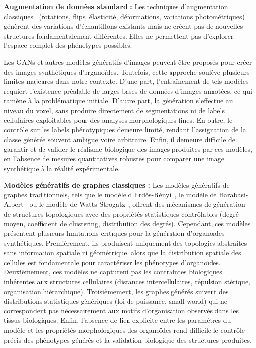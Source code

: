 \textbf{Augmentation de données standard :}
Les techniques d'augmentation classiques~\cite{Shorten2019} (rotations, flips, élasticité, déformations, variations photométriques) génèrent des variations d'échantillons existants mais ne créent pas de nouvelles structures fondamentalement différentes. Elles ne permettent pas d'explorer l'espace complet des phénotypes possibles.

Les GANs et autres modèles génératifs d'images peuvent être proposés pour créer des images synthétiques d'organoïdes. Toutefois, cette approche soulève plusieurs limites majeures dans notre contexte. D'une part, l'entraînement de tels modèles requiert l'existence préalable de larges bases de données d'images annotées, ce qui ramène à la problématique initiale. D'autre part, la génération s'effectue au niveau du voxel, sans produire directement de segmentations ni de labels cellulaires exploitables pour des analyses morphologiques fines. En outre, le contrôle sur les labels phénotypiques demeure limité, rendant l'assignation de la classe générée souvent ambiguë voire arbitraire. Enfin, il demeure difficile de garantir et de valider le réalisme biologique des images produites par ces modèles, en l'absence de mesures quantitatives robustes pour comparer une image synthétique à la réalité expérimentale.

\textbf{Modèles génératifs de graphes classiques :}
Les modèles génératifs de graphes traditionnels, tels que le modèle d'Erdős-Rényi~\cite{Erdos1959}, le modèle de Barabási-Albert~\cite{Barabasi1999} ou le modèle de Watts-Strogatz~\cite{Watts1998}, offrent des mécanismes de génération de structures topologiques avec des propriétés statistiques contrôlables (degré moyen, coefficient de clustering, distribution des degrés). Cependant, ces modèles présentent plusieurs limitations critiques pour la génération d'organoïdes synthétiques. Premièrement, ils produisent uniquement des topologies abstraites sans information spatiale ni géométrique, alors que la distribution spatiale des cellules est fondamentale pour caractériser les phénotypes d'organoïdes. Deuxièmement, ces modèles ne capturent pas les contraintes biologiques inhérentes aux structures cellulaires (distances intercellulaires, répulsion stérique, organisation hiérarchique). Troisièmement, les graphes générés suivent des distributions statistiques génériques (loi de puissance, small-world) qui ne correspondent pas nécessairement aux motifs d'organisation observés dans les tissus biologiques. Enfin, l'absence de lien explicite entre les paramètres du modèle et les propriétés morphologiques des organoïdes rend difficile le contrôle précis des phénotypes générés et la validation biologique des structures produites.

